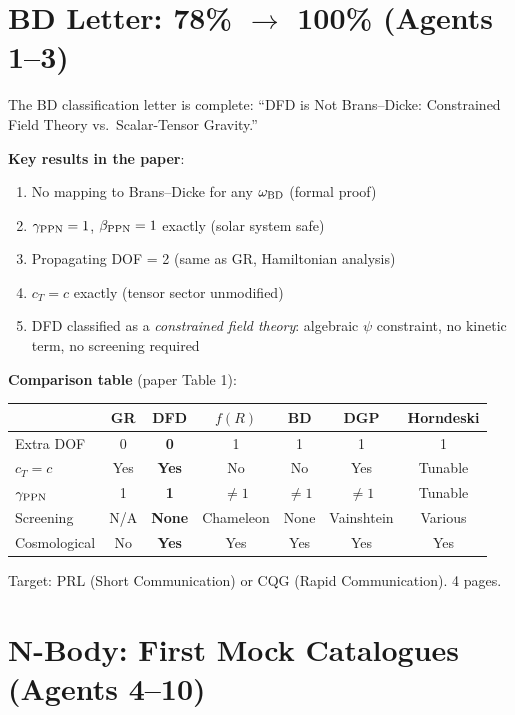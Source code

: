 \documentclass[11pt,a4paper]{article}
\begin{document}
\section{BD Letter: 78\% $\to$ 100\% (Agents 1--3)}

The BD classification letter is complete: ``DFD is Not Brans--Dicke: Constrained Field Theory vs.\ Scalar-Tensor Gravity.''

\textbf{Key results in the paper}:
\begin{enumerate}[nosep]
\item No mapping to Brans--Dicke for any $\omega_{\rm BD}$ (formal proof)
\item $\gamma_{\rm PPN} = 1$, $\beta_{\rm PPN} = 1$ exactly (solar system safe)
\item Propagating DOF = 2 (same as GR, Hamiltonian analysis)
\item $c_T = c$ exactly (tensor sector unmodified)
\item DFD classified as a \emph{constrained field theory}: algebraic $\psi$ constraint, no kinetic term, no screening required
\end{enumerate}

\textbf{Comparison table} (paper Table 1):
\begin{center}
\begin{tabular}{lcccccc}
\toprule
& \textbf{GR} & \textbf{DFD} & $f(R)$ & \textbf{BD} & \textbf{DGP} & \textbf{Horndeski} \\
\midrule
Extra DOF & 0 & \textbf{0} & 1 & 1 & 1 & 1 \\
$c_T = c$ & Yes & \textbf{Yes} & No & No & Yes & Tunable \\
$\gamma_{\rm PPN}$ & 1 & \textbf{1} & $\neq 1$ & $\neq 1$ & $\neq 1$ & Tunable \\
Screening & N/A & \textbf{None} & Chameleon & None & Vainshtein & Various \\
Cosmological & No & \textbf{Yes} & Yes & Yes & Yes & Yes \\
\bottomrule
\end{tabular}
\end{center}

Target: PRL (Short Communication) or CQG (Rapid Communication). 4 pages.

\section{N-Body: First Mock Catalogues (Agents 4--10)}
\end{document}
